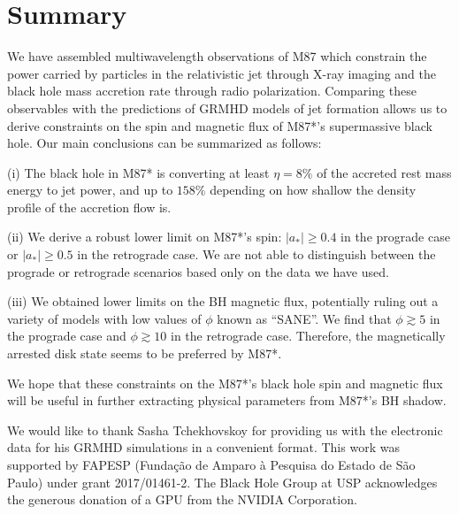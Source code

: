 \documentclass[twocolumn, linenumbers]{aastex62} %
\begin{document}
\section{Summary}	\label{sec:summary}

We have assembled multiwavelength observations of M87 which constrain the power carried by particles in the relativistic jet through X-ray imaging and the black hole mass accretion rate through radio polarization. Comparing these observables with the predictions of GRMHD models of jet formation allows us to derive constraints on the spin and magnetic flux of M87*'s supermassive black hole. Our main conclusions can be summarized as follows:

(i) The black hole in M87* is converting at least $\eta=8\%$ of the accreted rest mass energy to jet power, and up to $158\%$ depending on how shallow the density profile of the accretion flow is.

(ii) We derive a robust lower limit on M87*'s spin: $|a_*| \geq 0.4$ in the prograde case or $|a_*| \geq 0.5$ in the retrograde case. We are not able to distinguish between the prograde or retrograde scenarios based only on the data we have used.

(iii) We obtained lower limits on the BH magnetic flux, potentially ruling out a variety of models with low values of $\phi$ known as ``SANE''. We find that $\phi \gtrsim 5$ in the prograde case and $\phi \gtrsim 10$ in the retrograde case. Therefore, the magnetically arrested disk state seems to be preferred by M87*.


We hope that these constraints on the M87*'s black hole spin and magnetic flux will be useful in further extracting physical parameters from M87*'s BH shadow.




\acknowledgments

We would like to thank Sasha Tchekhovskoy for providing us with the electronic data for his GRMHD simulations in a convenient format. 
This work was supported by FAPESP (Funda\c{c}\~ao de Amparo \`a Pesquisa do Estado de S\~ao Paulo) under grant 2017/01461-2. The Black Hole Group at USP acknowledges the generous donation of a GPU from the NVIDIA Corporation. %

\vspace{5mm}
\end{document}
